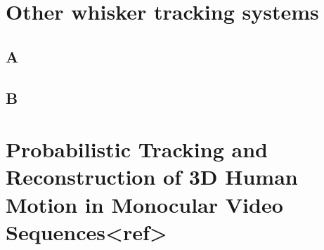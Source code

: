
\section{Other whisker tracking systems}
    \subsection{A}
    \subsection{B}

\section{Probabilistic Tracking and Reconstruction of 3D Human Motion in Monocular Video Sequences<ref>}



